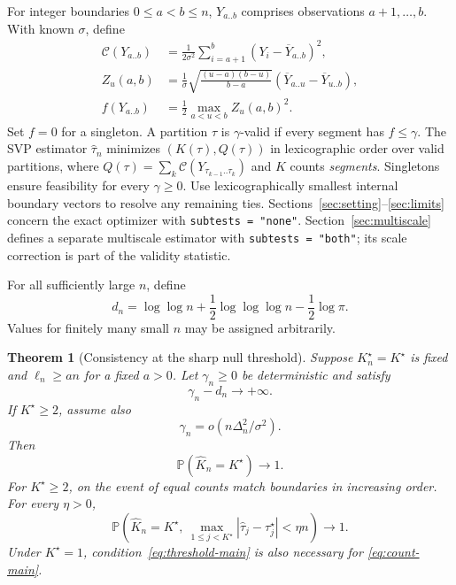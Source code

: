 \documentclass[pdflatex,sn-mathphys-num]{sn-jnl}
\newcommand{\Prob}{\mathbb P}
\newcommand{\C}{\mathcal C}
\newcommand{\taus}{\tau^\star}
\newcommand{\Kh}{\widehat K_n}
\newcommand{\tht}{\widehat\tau_n}
\theoremstyle{thmstyleone}
\newtheorem{theorem}{Theorem}
\theoremstyle{thmstyletwo}
\begin{document}
For integer boundaries $0\le a<b\le n$, $Y_{a..b}$ comprises observations
$a+1,\ldots,b$. With known $\sigma$, define
\begin{align}
\C(Y_{a..b})&=\frac{1}{2\sigma^2}\sum_{i=a+1}^b(Y_i-\overline Y_{a..b})^2,\label{eq:cost}\\
Z_u(a,b)&=\frac{1}{\sigma}\sqrt{\frac{(u-a)(b-u)}{b-a}}
  (\overline Y_{a..u}-\overline Y_{u..b}),\label{eq:contrast}\\
f(Y_{a..b})&=\frac12\max_{a<u<b} Z_u(a,b)^2.\label{eq:scan}
\end{align}
Set $f=0$ for a singleton. A partition $\tau$ is $\gamma$-valid if
every segment has $f\le\gamma$. The SVP estimator $\tht$ minimizes
$(K(\tau),Q(\tau))$ in lexicographic order over valid partitions, where
$Q(\tau)=\sum_k\C(Y_{\tau_{k-1}..\tau_k})$ and $K$ counts \emph{segments}.
Singletons ensure feasibility for every $\gamma\ge0$.
Use lexicographically smallest internal boundary vectors to resolve any remaining ties.
Sections~\ref{sec:setting}--\ref{sec:limits} concern the exact optimizer with
\texttt{subtests = "none"}. Section~\ref{sec:multiscale} defines a separate
multiscale estimator with \texttt{subtests = "both"}; its scale correction
is part of the validity statistic.

For all sufficiently large $n$, define
\begin{equation}\label{eq:centering}
d_n=\log\log n+\frac12\log\log\log n-\frac12\log\pi.
\end{equation}
Values for finitely many small $n$ may be assigned arbitrarily.

\begin{theorem}[Consistency at the sharp null threshold]\label{thm:main}
Suppose $K_n^\star=K^\star$ is fixed and $\ell_n\ge an$ for a fixed $a>0$.
Let $\gamma_n\ge0$ be deterministic and satisfy
\begin{equation}\label{eq:threshold-main}
\gamma_n-d_n\longrightarrow+\infty.
\end{equation}
If $K^\star\ge2$, assume also
\begin{equation}\label{eq:signal-main}
\gamma_n=o(n\Delta_n^2/\sigma^2).
\end{equation}
Then
\begin{equation}\label{eq:count-main}
\Prob(\Kh=K^\star)\longrightarrow1.
\end{equation}
For $K^\star\ge2$, on the event of equal counts match boundaries in increasing order.
For every $\eta>0$,
\begin{equation}\label{eq:relative-main}
\Prob\left(\Kh=K^\star,\ 
\max_{1\le j<K^\star}|\widehat\tau_j-\taus_j|<\eta n\right)
\longrightarrow1.
\end{equation}
Under $K^\star=1$, condition~\eqref{eq:threshold-main} is also necessary for
\eqref{eq:count-main}.
\end{theorem}
\end{document}
